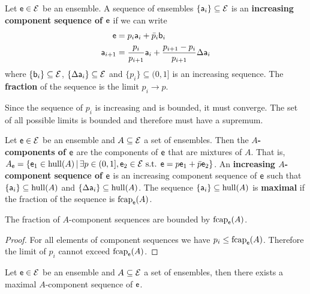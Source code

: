 \begin{defn}
	Let $\ens \in \Ens$ be an ensemble. A sequence of ensembles $\{\ens[a]_i\} \subseteq \Ens$ is an \textbf{increasing component sequence of $\ens$} if we can write
	\begin{align*}
		\ens &= p_i \ens[a]_i + \bar{p}_i \ens[b]_i  \\
		\ens[a]_{i+1} &= \frac{p_i}{p_{i+1}} \ens[a]_i + \frac{p_{i+1} - p_i}{p_{i+1}} \Delta \ens[a]_i
	\end{align*}
	where $\{\ens[b]_i\} \subseteq \Ens$, $\{\Delta\ens[a]_i\} \subseteq \Ens$ and $\{p_i\} \subseteq (0,1]$ is an increasing sequence. The \textbf{fraction} of the sequence is the limit $p_i \to p$.
\end{defn}

\begin{remark}
	Since the sequence of $p_i$ is increasing and is bounded, it must converge. The set of all possible limits is bounded and therefore must have a supremum.
\end{remark}

\begin{defn}
	Let $\ens \in \Ens$ be an ensemble and $A \subseteq \Ens$ a set of ensembles. Then the \textbf{$A$-components of $\ens$} are the components of $\ens$ that are mixtures of $A$. That is, $A_{\ens} = \{ \ens_1 \in \hull(A) \, | \, \exists p \in (0,1], \ens_2 \in \Ens \text{ s.t. } \ens = p \ens_1 + \bar{p} \ens_2  \}$. An \textbf{increasing $A$-component sequence of $\ens$} is an increasing component sequence of $\ens$ such that $\{\ens[a]_i\} \subseteq \hull(A)$ and $\{\Delta\ens[a]_i\} \subseteq \hull(A)$. The sequence $\{\ens[a]_i\} \subseteq \hull(A)$ is \textbf{maximal} if the fraction of the sequence is $\fcap_{\ens}(A)$.
\end{defn}

\begin{coro}
	The fraction of $A$-component sequences are bounded by $\fcap_{\ens}(A)$.
\end{coro}

\begin{proof}
	For all elements of component sequences we have $p_i \leq \fcap_{\ens}(A)$. Therefore the limit of $p_i$ cannot exceed $\fcap_{\ens}(A)$.
\end{proof}

\begin{prop}
	Let $\ens \in \Ens$ be an ensemble and $A \subseteq \Ens$ a set of ensembles, then there exists a maximal $A$-component sequence of $\ens$.
\end{prop}

